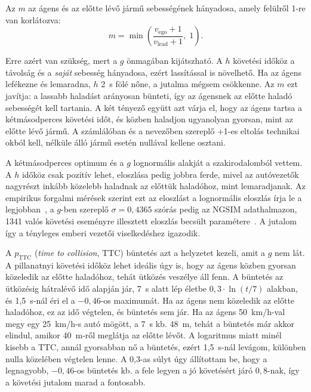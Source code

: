 \documentclass[a4paper,12pt,oneside]{article}
\begin{document}
Az $m$ az ágens és az előtte lévő jármű sebességének hányadosa, amely felülről 1-re van korlátozva:
\begin{equation}
  m = \min\!\left(\frac{v_{\text{ego}} + 1}{v_{\text{lead}} + 1},\; 1\right).
  \label{eq:r1_match}
\end{equation}

Erre azért van szükség, mert a $g$ önmagában kijátszható. A $h$ követési időköz a
távolság és a \emph{saját} sebesség hányadosa, ezért lassítással is növelhető. Ha az
ágens lefékezne és lemaradna, $h$ 2~s fölé nőne, a jutalma mégsem csökkenne. 
Az $m$ ezt javítja: a lassabb haladást arányosan bünteti, így az ágensnek az előtte haladó sebességét kell tartania. A két tényező együtt azt várja
el, hogy az ágens tartsa a kétmásodperces követési időt, és közben haladjon ugyanolyan
gyorsan, mint az előtte lévő jármű. 
A számlálóban és a nevezőben szereplő +1-es 
eltolás technikai okból kell, nélküle álló jármű esetén nullával kellene osztani.

A kétmásodperces optimum és a $g$ lognormális alakját a szakirodalomból vettem. A $h$
időköz csak pozitív lehet, eloszlása pedig jobbra ferde, mivel az autóvezetők nagyrészt inkább közelebb haladnak 
az előttük haladóhoz, mint lemaradjanak.
Az empirikus forgalmi mérések szerint ezt az eloszlást a lognormális eloszlás írja le a legjobban~\cite{mei1993lognormal},
a $g$-ben szereplő $\sigma = 0{,}4365$ szórás pedig az NGSIM adathalmazon, 1341 valós
követési eseményre illesztett eloszlás becsült paramétere~\cite{zhu2020velocity}. A
jutalom így a tényleges emberi vezetői viselkedéshez igazodik.

A $p_{\text{TTC}}$ (\emph{time to collision}, TTC) büntetés azt a helyzetet kezeli, amit a $g$ nem lát. A pillanatnyi
követési időköz lehet ideális úgy is, hogy az ágens közben gyorsan közeledik az előtte
haladóhoz, tehát ütközés veszélye áll fenn. 
A büntetés az ütközésig hátralévő idő alapján jár,
7~s alatt lép életbe $0{,}3 \cdot \ln(t/7)$ alakban, és 1,5~s-nál éri el a $-0{,}46$-os
maximumát. Ha az ágens nem közeledik az előtte haladóhoz, ez az idő végtelen, és
büntetés sem jár. Ha az ágens 50~km/h-val megy egy 25~km/h-s autó mögött,
a 7~s kb. 48~m, tehát a büntetés már akkor elindul, amikor 40~m-ről meglátja az előtte lévőt.
A logaritmus miatt minél kisebb a TTC, annál gyorsabban nő a büntetés, ezért 1,5~s-nál
levágom, különben nulla közelében végtelen lenne. A 0,3-as súlyt úgy állítottam be, hogy a
legnagyobb, $-0{,}46$-os büntetés kb. a fele legyen a jó követésért járó $0{,}8$-nak, így a
követési jutalom marad a fontosabb.
\end{document}
